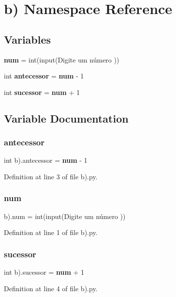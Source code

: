 \section{b) Namespace Reference}
\label{namespaceb_08}
\subsection*{Variables}
\begin{DoxyCompactItemize}
\item 
\textbf{ num} = int(input(\textquotesingle{}Digite um número \textquotesingle{}))
\item 
int \textbf{ antecessor} = \textbf{ num} -\/ 1
\item 
int \textbf{ sucessor} = \textbf{ num} + 1
\end{DoxyCompactItemize}


\subsection{Variable Documentation}
\mbox{\label{namespaceb_08_a0cbfc57a21400350983002f5d0df477e}} 
\subsubsection{antecessor}
{\footnotesize\ttfamily int b).antecessor = \textbf{ num} -\/ 1}



Definition at line 3 of file b).\+py.

\mbox{\label{namespaceb_08_a69c2c219888c75c29b156aac2c4295de}} 
\subsubsection{num}
{\footnotesize\ttfamily b).num = int(input(\textquotesingle{}Digite um número \textquotesingle{}))}



Definition at line 1 of file b).\+py.

\mbox{\label{namespaceb_08_a9aeee4f53ab4012cd0f70f9a453d556e}} 
\subsubsection{sucessor}
{\footnotesize\ttfamily int b).sucessor = \textbf{ num} + 1}



Definition at line 4 of file b).\+py.

